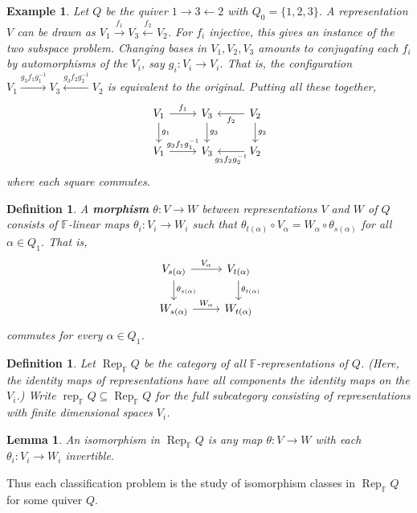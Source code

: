 \documentclass{book}
\newtheorem{lemma}[theorem]{Lemma}
\newtheorem{definition}[theorem]{Definition}
\newtheorem{example}{Example}[section]
\DeclareMathOperator{\Rep}{Rep}
\DeclareMathOperator{\rep}{rep}
\begin{document}
  	\begin{example}
    	Let $Q$ be the quiver $1\rightarrow 3\leftarrow 2$ with $Q_0=\{1,2,3\}$. A representation $V$ can be drawn as $V_1 \xrightarrow{f_1} V_3 \xleftarrow{f_2} V_2$. For $f_i$ injective, this gives an instance of the two subspace problem. Changing bases in $V_1,V_2,V_3$ amounts to conjugating each $f_i$ by automorphisms of the $V_i$, say $g_i:V_i\to V_i$. That is, the configuration $V_1 \xrightarrow{g_3 f_1 g_1^{-1}} V_3 \xleftarrow{g_3 f_2 g_2^{-1}} V_2$ is equivalent to the original. Putting all these together, 
		\[ \begin{tikzcd}
		V_1 \arrow{r}{f_1} \arrow{d}{g_1} & V_3 \arrow{d}{g_3}& V_2 \arrow{l}{f_2}\arrow{d}{g_2} \\
		V_1 \arrow{r}{g_3f_1g_1^{-1}}& V_3 & V_2 \arrow{l}{g_3f_2g_2^{-1}}
		\end{tikzcd}\]
	where each square commutes.
    	\end{example}
    
   	 \begin{definition}
    	A \textbf{morphism} $\theta:V\to W$ between representations $V$ and $W$ of $Q$ consists of $\mathbb{F}$-linear maps $\theta_i:V_i\to W_i$ such that $\theta_{t(\alpha)} \circ V_\alpha = W_\alpha\circ \theta_{s(\alpha)}$ for all $\alpha\in Q_1$. That is,
	\[ \begin{tikzcd}
		V_{s(\alpha)} \arrow{r}{V_\alpha} \arrow{d}{\theta_{s(\alpha)}} & V_{t(\alpha)} \arrow{d}{\theta_{t(\alpha)}}\\
		W_{s(\alpha)} \arrow{r}{W_\alpha}& W_{t(\alpha)}
		\end{tikzcd}\]
		commutes for every $\alpha\in Q_1$.
    	\end{definition}
    
   	 \begin{definition}
    	Let $\Rep_\mathbb{F}Q$ be the category of all $\mathbb{F}$-representations of $Q$. (Here, the identity maps of representations have all components the identity maps on the $V_i$.) Write $\rep_\mathbb{F}Q \subseteq \Rep_\mathbb{F}Q$ for the full subcategory consisting of representations with finite dimensional spaces $V_i$.
    	\end{definition}
    
    	\begin{lemma}
    		An isomorphism in $\Rep_\mathbb{F}Q$ is any map $\theta:V\to W$ with each $\theta_i:V_i\to W_i$ invertible.
    	\end{lemma}
    
    	Thus each classification problem is the study of isomorphism classes in $\Rep_\mathbb{F}Q$ for some quiver $Q$.
\end{document}
